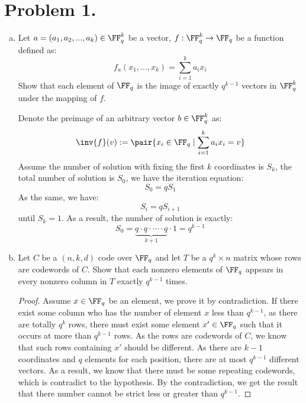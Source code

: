 \section{Problem 1.}
\begin{enumerate}[(a)]
\item Let \( a = ( a_1, a_2, ..., a_k ) \in \FF_q^k \) be a vector, \( f : \FF_q^k \to \FF_q \) be a function defined as:
\[
    f_a ( x_1, ..., x_k ) = \sum_{ i = 1 }^k a_i x_i
\]
Show that each element of \( \FF_q \) is the image of exactly \( q^{ k - 1 } \) vectors in \( \FF_q^k \) under the mapping of \( f \).
\begin{solution}
Denote the preimage of an arbitrary vector \( b \in \FF_q^k \) as:
\[
    \inv{f}( v ) :=
    \pair{ x_i \in \FF_q
    \mid \sum_{ i = 1 }^k a_i x_i = v }
\]
Assume the number of solution with fixing the first \( k \) coordinates is \( S_k \), the total number of solution is \( S_0 \), we have the iteration equation:
\[
    S_0 = q S_1
\]
As the same, we have:
\[
    S_i = q S_{ i + 1 }
\]
until \( S_k = 1 \). As a result, the number of solution is exactly:
\[
    S_0 = \underbrace{ q \cdot q \cdot \cdots \cdot q }_{ k + 1 } \cdot 1 = q^{ k - 1 }
\]

\end{solution}

\item Let \( C \) be a \( ( n, k, d ) \) code over \( \FF_q \) and let \( T \) be a \( q^k \times n \) matrix whose rows are codewords of \( C \). Show that each nonzero elements of \( \FF_q \) appears in every nonzero column in \( T \) exactly \( q^{ k - 1 } \) times.
\begin{proof}
    Assume \( x \in \FF_q \) be an element, we prove it by contradiction. If there exist some column who has the number of element \( x \) less than \( q^{ k - 1 } \), as there are totally \( q^{ k } \) rows, there must exist some element \( x' \in \FF_q \) such that it occurs at more than \( q^{k - 1} \) rows. As the rows are codewords of \( C \), we know that such rows containing \( x' \) should be different. As there are \( k - 1 \) coordinates and \( q \) elements for each position, there are at most \( q^{ k - 1 } \) different vectors. As a result, we know that there must be some repeating codewords, which is contradict to the hypothesis. By the contradiction, we get the result that there number cannot be strict less or greater than \( q^{ k - 1 } \).
\end{proof}

\end{enumerate}

